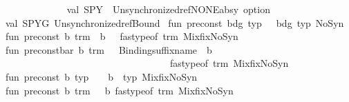 \begin{isabellebody}
\ \ \ \ \ \ \ \ \ \ \ \ {\isacharbraceright}{\kern0pt}\isanewline
\isanewline
\isanewline
val\ SPY\ {\isacharequal}{\kern0pt}\ Unsynchronized{\isachardot}{\kern0pt}ref{\isacharparenleft}{\kern0pt}NONE{\isacharcolon}{\kern0pt}absy\ option{\isacharparenright}{\kern0pt}\isanewline
val\ SPYG{\isacharequal}{\kern0pt}\ Unsynchronized{\isachardot}{\kern0pt}ref{\isacharparenleft}{\kern0pt}{\isacharbrackleft}{\kern0pt}Bound\ {}{\isacharbrackright}{\kern0pt}{\isacharparenright}{\kern0pt}\isanewline
\isanewline
fun\ pre{\isacharunderscore}{\kern0pt}const\ {\isacharparenleft}{\kern0pt}{\isacharparenleft}{\kern0pt}bdg{\isacharcomma}{\kern0pt}\ typ{\isacharparenright}{\kern0pt}{\isacharcomma}{\kern0pt}\ {\isacharunderscore}{\kern0pt}{\isacharparenright}{\kern0pt}\ {\isacharequal}{\kern0pt}\ {\isacharparenleft}{\kern0pt}bdg{\isacharcomma}{\kern0pt}\ typ{\isacharcomma}{\kern0pt}\ NoSyn{\isacharparenright}{\kern0pt}\isanewline
fun\ pre{\isacharunderscore}{\kern0pt}const{\isacharprime}{\kern0pt}\ {\isacharparenleft}{\kern0pt}b{\isacharcomma}{\kern0pt}\ trm{\isacharparenright}{\kern0pt}\ {\isacharequal}{\kern0pt}\ {\isacharparenleft}{\kern0pt}b{\isacharcomma}{\kern0pt}\ \ \ fastype{\isacharunderscore}{\kern0pt}of\ trm{\isacharcomma}{\kern0pt}\ Mixfix{\isachardot}{\kern0pt}NoSyn{\isacharparenright}{\kern0pt}\ \isanewline
fun\ pre{\isacharunderscore}{\kern0pt}const{\isacharunderscore}{\kern0pt}bar\ {\isacharparenleft}{\kern0pt}b{\isacharcomma}{\kern0pt}\ trm{\isacharcomma}{\kern0pt}\ {\isacharunderscore}{\kern0pt}{\isacharparenright}{\kern0pt}\ {\isacharequal}{\kern0pt}\ {\isacharparenleft}{\kern0pt}Binding{\isachardot}{\kern0pt}suffix{\isacharunderscore}{\kern0pt}name\ {\isachardoublequote}{\kern0pt}{\isacharprime}{\kern0pt}{\isachardoublequote}{\kern0pt}\ b{\isacharcomma}{\kern0pt}\ \ \isanewline
\ \ \ \ \ \ \ \ \ \ \ \ \ \ \ \ \ \ \ \ \ \ \ \ \ \ \ \ \ \ \ \ \ \ fastype{\isacharunderscore}{\kern0pt}of\ trm{\isacharcomma}{\kern0pt}\ Mixfix{\isachardot}{\kern0pt}NoSyn{\isacharparenright}{\kern0pt}\ \isanewline
fun\ pre{\isacharunderscore}{\kern0pt}const{}\ {\isacharparenleft}{\kern0pt}b{\isacharcomma}{\kern0pt}\ typ{\isacharcomma}{\kern0pt}\ {\isacharunderscore}{\kern0pt}{\isacharcomma}{\kern0pt}\ {\isacharunderscore}{\kern0pt}{\isacharparenright}{\kern0pt}\ {\isacharequal}{\kern0pt}\ {\isacharparenleft}{\kern0pt}b{\isacharcomma}{\kern0pt}\ \ typ{\isacharcomma}{\kern0pt}\ Mixfix{\isachardot}{\kern0pt}NoSyn{\isacharparenright}{\kern0pt}\ \isanewline
fun\ pre{\isacharunderscore}{\kern0pt}const{}\ {\isacharparenleft}{\kern0pt}b{\isacharcomma}{\kern0pt}\ trm{\isacharcomma}{\kern0pt}\ {\isacharunderscore}{\kern0pt}{\isacharparenright}{\kern0pt}\ {\isacharequal}{\kern0pt}\ {\isacharparenleft}{\kern0pt}b{\isacharcomma}{\kern0pt}\ fastype{\isacharunderscore}{\kern0pt}of\ trm{\isacharcomma}{\kern0pt}\ Mixfix{\isachardot}{\kern0pt}NoSyn{\isacharparenright}{\kern0pt}\ \isanewline

\end{isabellebody}
